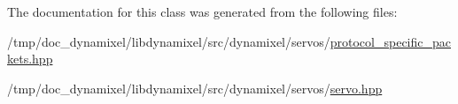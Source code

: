 The documentation for this class was generated from the following files\+:\begin{DoxyCompactItemize}
\item 
/tmp/doc\+\_\+dynamixel/libdynamixel/src/dynamixel/servos/\hyperlink{protocol__specific__packets_8hpp}{protocol\+\_\+specific\+\_\+packets.\+hpp}\item 
/tmp/doc\+\_\+dynamixel/libdynamixel/src/dynamixel/servos/\hyperlink{servo_8hpp}{servo.\+hpp}\end{DoxyCompactItemize}
